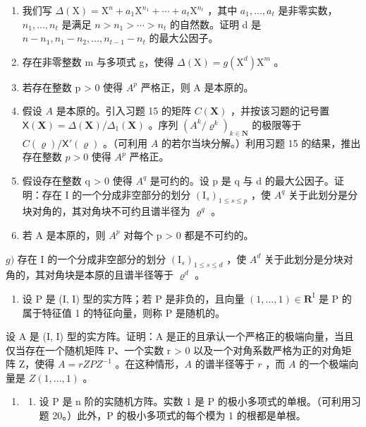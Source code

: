 \begin{enumerate}
\def\labelenumi{\alph{enumi})}
\item
  我们写 \(\Delta(\mathrm{X}) = \mathrm{X}^{n} + a_{1}\mathrm{X}^{n_{1}} + \cdots + a_{t}\mathrm{X}^{n_{t}}\) ，其中 \(a_{1}, \ldots, a_{t}\) 是非零实数，\(n_{1}, \ldots, n_{t}\) 是满足 \(n > n_{1} > \cdots > n_{t}\) 的自然数。证明 d 是 \(n - n_{1}, n_{1} - n_{2}, \ldots, n_{t-1} - n_{t}\) 的最大公因子。
\item
  存在非零整数 m 与多项式 g，使得 \(\Delta(\mathrm{X}) = g(\mathrm{X}^{d})\mathrm{X}^{m}\) 。
\item
  若存在整数 p \textgreater{} 0 使得 \(A^{p}\) 严格正，则 A 是本原的。
\item
  假设 \(A\) 是本原的。引入习题 15 的矩阵 \(C(\mathbf{X})\) ，并按该习题的记号置 \(\mathsf{X}(\mathbf{X}) = \Delta (\mathbf{X}) / \Delta_1(\mathbf{X})\) 。序列 \((A^k /\varrho^k)_{k\in \mathbf{N}}\) 的极限等于 \(C(\varrho) / \mathsf{X}'(\varrho)\) 。（可利用 \(A\) 的若尔当块分解。）利用习题 15 的结果，推出存在整数 \(p > 0\) 使得 \(A^p\) 严格正。
\item
  假设存在整数 q \textgreater{} 0 使得 \(A^{q}\) 是可约的。设 p 是 q 与 d 的最大公因子。证明：存在 I 的一个分成非空部分的划分 \((\mathrm{I}_{s})_{1 \leqslant s \leqslant p}\) ，使 \(A^{q}\) 关于此划分是分块对角的，其对角块不可约且谱半径为 \(\varrho^{q}\) 。
\item
  若 A 是本原的，则 \(A^{p}\) 对每个 p \textgreater{} 0 都是不可约的。
\end{enumerate}

\(g)\) 存在 I 的一个分成非空部分的划分 \((\mathrm{I}_s)_{1 \leqslant s \leqslant d}\) ，使 \(A^d\) 关于此划分是分块对角的，其对角块是本原的且谱半径等于 \(\varrho^d\) 。

\begin{enumerate}
\def\labelenumi{\arabic{enumi})}
\setcounter{enumi}{22}
\tightlist
\item
  设 P 是 (I, I) 型的实方阵；若 P 是非负的，且向量 \((1, \ldots, 1) \in \mathbf{R}^{\mathrm{I}}\) 是 P 的属于特征值 1 的特征向量，则称 P 是随机的。
\end{enumerate}

设 A 是 (I, I) 型的实方阵。证明：A 是正的且承认一个严格正的极端向量，当且仅当存在一个随机矩阵 P、一个实数 r \textgreater{} 0 以及一个对角系数严格为正的对角矩阵 Z，使得 \(A = rZPZ^{-1}\) 。在这种情形，\(A\) 的谱半径等于 \(r\) ，而 \(A\) 的一个极端向量是 \(Z(1, \ldots, 1)\) 。

\begin{enumerate}
\def\labelenumi{\arabic{enumi})}
\setcounter{enumi}{23}
\tightlist
\item
  \begin{enumerate}
  \def\labelenumii{\alph{enumii})}
  \tightlist
  \item
    设 P 是 n 阶的实随机方阵。实数 1 是 P 的极小多项式的单根。（可利用习题 20。）此外，P 的极小多项式的每个模为 1 的根都是单根。
  \end{enumerate}
\end{enumerate}

